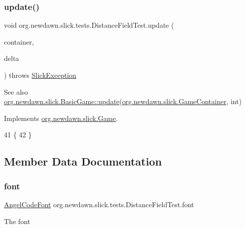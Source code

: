 \mbox{\label{classorg_1_1newdawn_1_1slick_1_1tests_1_1_distance_field_test_a7042da06a8ba286741d9bb230f6ad9fa}} 
\subsubsection{\texorpdfstring{update()}{update()}}
{\footnotesize\ttfamily void org.\+newdawn.\+slick.\+tests.\+Distance\+Field\+Test.\+update (\begin{DoxyParamCaption}\item[{\mbox{\hyperlink{classorg_1_1newdawn_1_1slick_1_1_game_container}{Game\+Container}}}]{container,  }\item[{int}]{delta }\end{DoxyParamCaption}) throws \mbox{\hyperlink{classorg_1_1newdawn_1_1slick_1_1_slick_exception}{Slick\+Exception}}\hspace{0.3cm}{\ttfamily [inline]}}

\begin{DoxySeeAlso}{See also}
\mbox{\hyperlink{classorg_1_1newdawn_1_1slick_1_1_basic_game_acfe6fa05aef83bff1631af91a3e4bd20}{org.\+newdawn.\+slick.\+Basic\+Game\+::update}}(\mbox{\hyperlink{classorg_1_1newdawn_1_1slick_1_1_game_container}{org.\+newdawn.\+slick.\+Game\+Container}}, int) 
\end{DoxySeeAlso}


Implements \mbox{\hyperlink{interfaceorg_1_1newdawn_1_1slick_1_1_game_ab07b2e9463ee4631620dde0de25bdee8}{org.\+newdawn.\+slick.\+Game}}.


\begin{DoxyCode}
41                                   \{
42     \}
\end{DoxyCode}


\subsection{Member Data Documentation}
\mbox{\label{classorg_1_1newdawn_1_1slick_1_1tests_1_1_distance_field_test_aa6d827cd10230d8840d998c885d6103d}} 
\subsubsection{\texorpdfstring{font}{font}}
{\footnotesize\ttfamily \mbox{\hyperlink{classorg_1_1newdawn_1_1slick_1_1_angel_code_font}{Angel\+Code\+Font}} org.\+newdawn.\+slick.\+tests.\+Distance\+Field\+Test.\+font\hspace{0.3cm}{\ttfamily [private]}}

The font 